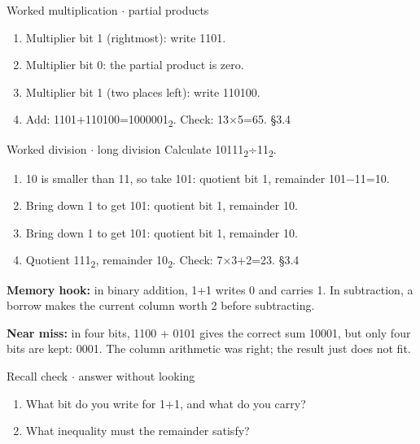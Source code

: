 \documentclass[11pt]{article}
\begin{document}
\begin{keepsection}
\begin{keepsection}
\begin{workedbox}{Worked multiplication \ensuremath{\cdot} partial products}
\begin{enumerate}
\item Multiplier bit 1 (rightmost): write 1101.
\item Multiplier bit 0: the partial product is zero.
\item Multiplier bit 1 (two places left): write 110100.
\item Add: 1101+110100=1000001\textsubscript{2}. Check: 13\ensuremath{\times}5=65. \hfill{\small\color{FAUblue}§3.4}
\end{enumerate}
\end{workedbox}

\begin{workedbox}{Worked division \ensuremath{\cdot} long division}
Calculate 10111\textsubscript{2}÷11\textsubscript{2}.

\begin{enumerate}
\item 10 is smaller than 11, so take 101: quotient bit 1, remainder 101\ensuremath{-}11=10.
\item Bring down 1 to get 101: quotient bit 1, remainder 10.
\item Bring down 1 to get 101: quotient bit 1, remainder 10.
\item Quotient 111\textsubscript{2}, remainder 10\textsubscript{2}. Check: 7\ensuremath{\times}3+2=23. \hfill{\small\color{FAUblue}§3.4}
\end{enumerate}
\end{workedbox}

\begin{notebox}\textbf{Memory hook:} in binary addition, 1+1 writes 0 and carries 1. In subtraction, a borrow makes the current column worth 2 before subtracting.\end{notebox}

\begin{notebox}\textbf{Near miss:} in four bits, 1100 + 0101 gives the correct sum 10001, but only four bits are kept: 0001. The column arithmetic was right; the result just does not fit.\end{notebox}

\begin{recallbox}{Recall check \ensuremath{\cdot} answer without looking}
\begin{enumerate}
\item What bit do you write for 1+1, and what do you carry?
\item What inequality must the remainder satisfy?
\end{enumerate}

\end{recallbox}
\end{keepsection}
\end{keepsection}
\end{document}
